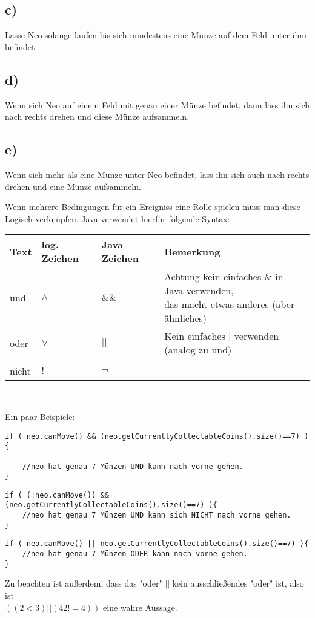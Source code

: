 	\subsection*{c)}
	Lasse Neo solange laufen bis sich mindestens eine Münze auf dem Feld unter ihm befindet.
	\subsection*{d)}
	Wenn sich Neo auf einem Feld mit genau einer Münze befindet, dann lass ihn sich nach rechts drehen und diese Münze aufsammeln.
	\subsection*{e)}
	Wenn sich mehr als eine Münze unter Neo befindet, lass ihn sich auch nach rechts drehen und eine Münze aufsammeln.


\begin{Infobox}
Wenn mehrere Bedingungen für ein Ereigniss eine Rolle spielen muss man diese Logisch verknüpfen. Java verwendet hierfür folgende Syntax:
\begin{center}
        \begin{tabular}{ l | l | l | l}
            Text & log. Zeichen & Java Zeichen &Bemerkung \\
            \hline
            und  &$\land$& $\&\&$& \minibox{Achtung kein einfaches \& in Java verwenden,\\ das macht etwas anderes (aber ähnliches)} \\
            oder  &$\lor$& $||$& Kein einfaches $|$ verwenden (analog zu und) \\
            & &  \\

            nicht & $!$&$\neg$ &\\
    \end{tabular}\\
\end{center}
Ein paar Beispiele:
\begin{lstlisting}
if ( neo.canMove() && (neo.getCurrentlyCollectableCoins().size()==7) ){

	//neo hat genau 7 Münzen UND kann nach vorne gehen.
}
\end{lstlisting}

\begin{lstlisting}
if ( (!neo.canMove()) && (neo.getCurrentlyCollectableCoins().size()==7) ){
	//neo hat genau 7 Münzen UND kann sich NICHT nach vorne gehen.
}
\end{lstlisting}

\begin{lstlisting}
if ( neo.canMove() || neo.getCurrentlyCollectableCoins().size()==7) ){
	//neo hat genau 7 Münzen ODER kann nach vorne gehen.
}
\end{lstlisting}
Zu beachten ist außerdem, dass das "oder" $||$ kein ausschließendes "oder" ist, also ist \\ $((2 < 3) || (42 != 4))$ eine wahre Aussage.
\end{Infobox}
